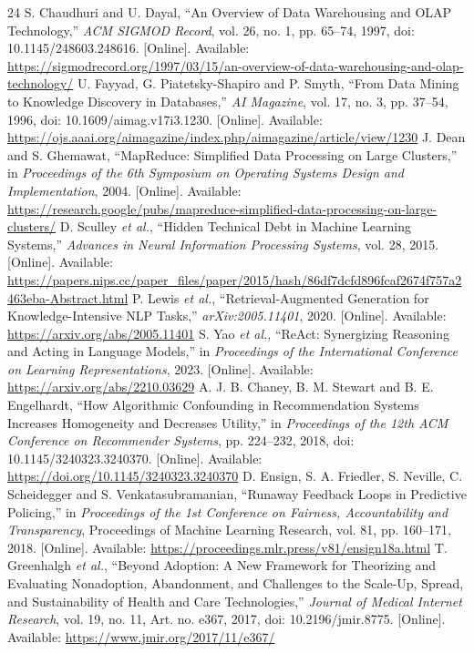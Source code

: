 \documentclass[journal]{IEEEtran}
\begin{document}
\begin{thebibliography}{24}
 S. Chaudhuri and U. Dayal, ``An Overview of Data Warehousing and OLAP Technology,'' \emph{ACM SIGMOD Record}, vol. 26, no. 1, pp. 65--74, 1997, doi: 10.1145/248603.248616. [Online]. Available: \url{https://sigmodrecord.org/1997/03/15/an-overview-of-data-warehousing-and-olap-technology/}
 U. Fayyad, G. Piatetsky-Shapiro and P. Smyth, ``From Data Mining to Knowledge Discovery in Databases,'' \emph{AI Magazine}, vol. 17, no. 3, pp. 37--54, 1996, doi: 10.1609/aimag.v17i3.1230. [Online]. Available: \url{https://ojs.aaai.org/aimagazine/index.php/aimagazine/article/view/1230}
 J. Dean and S. Ghemawat, ``MapReduce: Simplified Data Processing on Large Clusters,'' in \emph{Proceedings of the 6th Symposium on Operating Systems Design and Implementation}, 2004. [Online]. Available: \url{https://research.google/pubs/mapreduce-simplified-data-processing-on-large-clusters/}
 D. Sculley \emph{et al.}, ``Hidden Technical Debt in Machine Learning Systems,'' \emph{Advances in Neural Information Processing Systems}, vol. 28, 2015. [Online]. Available: \url{https://papers.nips.cc/paper_files/paper/2015/hash/86df7dcfd896fcaf2674f757a2463eba-Abstract.html}
 P. Lewis \emph{et al.}, ``Retrieval-Augmented Generation for Knowledge-Intensive NLP Tasks,'' \emph{arXiv:2005.11401}, 2020. [Online]. Available: \url{https://arxiv.org/abs/2005.11401}
 S. Yao \emph{et al.}, ``ReAct: Synergizing Reasoning and Acting in Language Models,'' in \emph{Proceedings of the International Conference on Learning Representations}, 2023. [Online]. Available: \url{https://arxiv.org/abs/2210.03629}
 A. J. B. Chaney, B. M. Stewart and B. E. Engelhardt, ``How Algorithmic Confounding in Recommendation Systems Increases Homogeneity and Decreases Utility,'' in \emph{Proceedings of the 12th ACM Conference on Recommender Systems}, pp. 224--232, 2018, doi: 10.1145/3240323.3240370. [Online]. Available: \url{https://doi.org/10.1145/3240323.3240370}
 D. Ensign, S. A. Friedler, S. Neville, C. Scheidegger and S. Venkatasubramanian, ``Runaway Feedback Loops in Predictive Policing,'' in \emph{Proceedings of the 1st Conference on Fairness, Accountability and Transparency}, Proceedings of Machine Learning Research, vol. 81, pp. 160--171, 2018. [Online]. Available: \url{https://proceedings.mlr.press/v81/ensign18a.html}
 T. Greenhalgh \emph{et al.}, ``Beyond Adoption: A New Framework for Theorizing and Evaluating Nonadoption, Abandonment, and Challenges to the Scale-Up, Spread, and Sustainability of Health and Care Technologies,'' \emph{Journal of Medical Internet Research}, vol. 19, no. 11, Art. no. e367, 2017, doi: 10.2196/jmir.8775. [Online]. Available: \url{https://www.jmir.org/2017/11/e367/}
\end{thebibliography}
\end{document}
